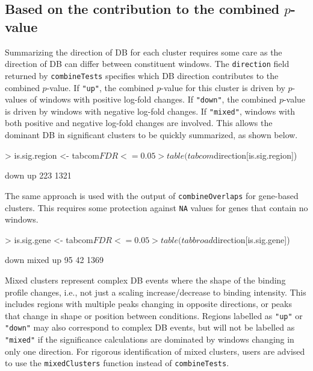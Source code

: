\documentclass[12pt]{report}
\renewenvironment{Schunk}{\vspace{0pt}}{\vspace{0pt}}
\newcommand{\code}[1]{{\small\texttt{#1}}}
\begin{document}
\subsection{Based on the contribution to the combined $p$-value}
Summarizing the direction of DB for each cluster requires some care as the direction of DB can differ between constituent windows.
The \code{direction} field returned by \code{combineTests} specifies which DB direction contributes to the combined $p$-value.
If \code{"up"}, the combined $p$-value for this cluster is driven by $p$-values of windows with positive log-fold changes.
If \code{"down"}, the combined $p$-value is driven by windows with negative log-fold changes.
If \code{"mixed"}, windows with both positive and negative log-fold changes are involved.
This allows the dominant DB in significant clusters to be quickly summarized, as shown below.

\begin{Schunk}
\begin{Sinput}
> is.sig.region <- tabcom$FDR <= 0.05
> table(tabcom$direction[is.sig.region])
\end{Sinput}
\begin{Soutput}
down   up 
 223 1321 
\end{Soutput}
\end{Schunk}

The same approach is used with the output of \code{combineOverlaps} for gene-based clusters.
This requires some protection against \code{NA} values for genes that contain no windows.

\begin{Schunk}
\begin{Sinput}
> is.sig.gene <- tabcom$FDR <= 0.05
> table(tabbroad$direction[is.sig.gene])
\end{Sinput}
\begin{Soutput}
 down mixed    up 
   95    42  1369 
\end{Soutput}
\end{Schunk}

Mixed clusters represent complex DB events where the shape of the binding profile changes, i.e., not just a scaling increase/decrease to binding intensity.
This includes regions with multiple peaks changing in opposite directions, or peaks that change in shape or position between conditions.
Regions labelled as \code{"up"} or \code{"down"} may also correspond to complex DB events,
but will not be labelled as \code{"mixed"} if the significance calculations are dominated by windows changing in only one direction.
For rigorous identification of mixed clusters, users are advised to use the \code{mixedClusters} function instead of \code{combineTests}.
\end{document}
